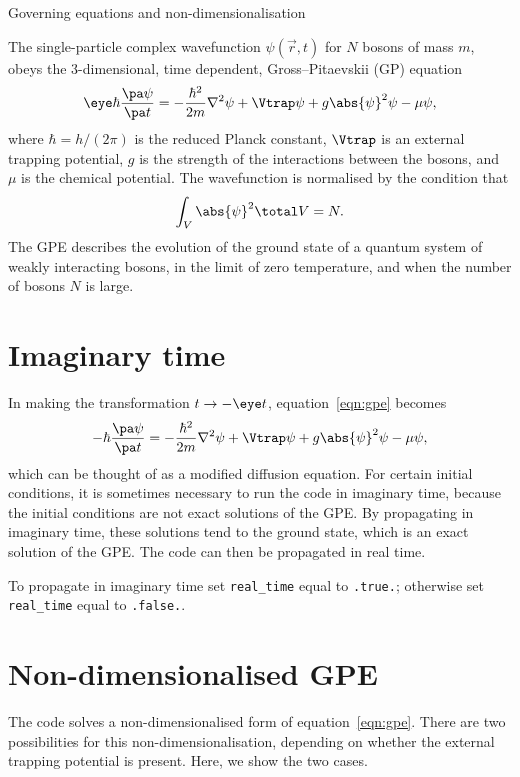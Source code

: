 %
%
\begin{chapter}{\label{cha:equations}Governing equations and
  non-dimensionalisation}

  The single-particle complex wavefunction $\psi(\vec{r}, t)$ for $N$ bosons of
  mass $m$, obeys the 3-dimensional, time dependent, Gross--Pitaevskii (GP)
  equation \citep{Gross61,Pitaevskii61}
  \begin{equation}
    \eye \hbar \frac{\pa \psi}{\pa t} = -\frac{\hbar^{2}}{2m} \nabla^{2} \psi +
    \Vtrap \psi + g \abs{\psi}^{2} \psi - \mu \psi,
    \label{eqn:gpe}
  \end{equation}
  where $\hbar = h/(2\pi)$ is the reduced Planck constant, $\Vtrap$ is an
  external trapping potential, $g$ is the strength of the interactions between
  the bosons, and $\mu$ is the chemical potential.  The wavefunction is
  normalised by the condition that
  \begin{equation*}
    \int_{V}{\abs{\psi}^{2}}\total V = N.
  \end{equation*}
  The GPE describes the evolution of the ground state of a quantum system of
  weakly interacting bosons, in the limit of zero temperature, and when the
  number of bosons $N$ is large.

  \section{Imaginary time}
  In making the transformation $t \to -\eye t$, equation~\eqref{eqn:gpe}
  becomes
  \begin{equation*}
    -\hbar \frac{\pa \psi}{\pa t} = -\frac{\hbar^{2}}{2m} \nabla^{2} \psi +
    \Vtrap \psi + g \abs{\psi}^{2} \psi - \mu \psi,
  \end{equation*}
  which can be thought of as a modified diffusion equation.  For certain
  initial conditions, it is sometimes necessary to run the code in imaginary
  time, because the initial conditions are not exact solutions of the GPE.  By
  propagating in imaginary time, these solutions tend to the ground state,
  which is an exact solution of the GPE.  The code can then be propagated in
  real time.

  To propagate in imaginary time set \verb"real_time" equal to \verb".true.";
  otherwise set \verb"real_time" equal to \verb".false.".

  \section{\label{sec:nondimgpe}Non-dimensionalised GPE}
  The code solves a non-dimensionalised form of equation~\eqref{eqn:gpe}.
  There are two possibilities for this non-dimensionalisation, depending on
  whether the external trapping potential is present.  Here, we show the two
  cases.


\end{chapter}
